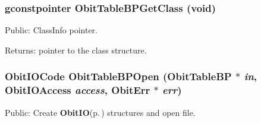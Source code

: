 \subsubsection{\setlength{\rightskip}{0pt plus 5cm}gconstpointer Obit\-Table\-BPGet\-Class (void)}\label{ObitTableBP_8h_a13}


Public: Class\-Info pointer. 

\begin{Desc}
\item[Returns:]pointer to the class structure. \end{Desc}
\subsubsection{\setlength{\rightskip}{0pt plus 5cm}Obit\-IOCode Obit\-Table\-BPOpen ({\bf Obit\-Table\-BP} $\ast$ {\em in}, Obit\-IOAccess {\em access}, {\bf Obit\-Err} $\ast$ {\em err})}\label{ObitTableBP_8h_a17}


Public: Create {\bf Obit\-IO}{\rm (p.\,\pageref{structObitIO})} structures and open file. 

